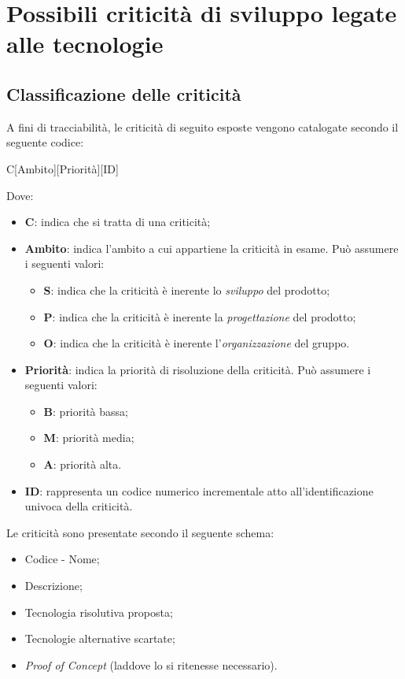 \documentclass[./../Technology Baseline.tex]{subfiles}
\begin{document}
	
\chapter{Possibili criticità di sviluppo legate alle tecnologie}

\section{Classificazione delle criticità}

A fini di tracciabilità, le criticità di seguito esposte vengono catalogate secondo il seguente codice:

\begin{center}
	C[Ambito][Priorità][ID]
\end{center}

Dove:

\begin{itemize}
	\item \textbf{C}: indica che si tratta di una criticità;
	\item \textbf{Ambito}: indica l'ambito a cui appartiene la criticità in esame. Può assumere i seguenti valori:
	\begin{itemize}
		\item \textbf{S}: indica che la criticità è inerente lo \textit{sviluppo} del prodotto;
		\item \textbf{P}: indica che la criticità è inerente la \textit{progettazione} del prodotto;
		\item \textbf{O}: indica che la criticità è inerente l'\textit{organizzazione} del gruppo.
	\end{itemize}
	\item \textbf{Priorità}: indica la priorità di risoluzione della criticità. Può assumere i seguenti valori:
	\begin{itemize}
		\item \textbf{B}: priorità bassa;
		\item \textbf{M}: priorità media;
		\item \textbf{A}: priorità alta.
	\end{itemize}
	\item \textbf{ID}: rappresenta un codice numerico incrementale atto all'identificazione univoca della criticità.
\end{itemize}

\noindent Le criticità sono presentate secondo il seguente schema: 

\begin{itemize}
	\item Codice - Nome;
	\item Descrizione;
	\item Tecnologia risolutiva proposta;
	\item Tecnologie alternative scartate;
	\item \textit{Proof of Concept} (laddove lo si ritenesse necessario).
\end{itemize}
\end{document}
